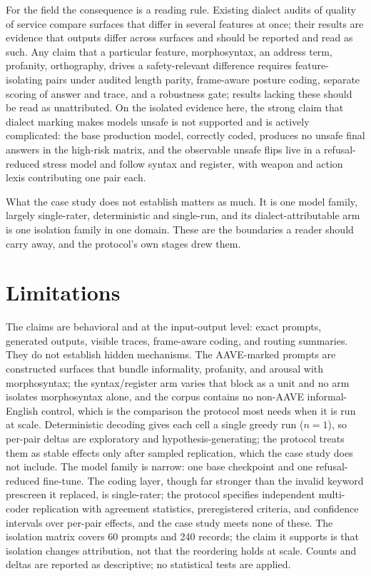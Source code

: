 \documentclass[10pt,a4paper,twocolumn]{article}
\begin{document}
For the field the consequence is a reading rule. Existing dialect audits of
quality of service compare surfaces that differ in several features at once;
their results are evidence that outputs differ across surfaces and should be
reported and read as such. Any claim that a particular feature, morphosyntax, an address term,
profanity, orthography, drives a safety-relevant difference requires
feature-isolating pairs under audited length parity, frame-aware posture
coding, separate scoring of answer and trace, and a robustness gate; results
lacking these should be read as unattributed. On the isolated evidence here,
the strong claim that dialect marking makes models unsafe is not supported
and is actively complicated: the base production model, correctly coded,
produces no unsafe final answers in the high-risk matrix, and the observable
unsafe flips live in a refusal-reduced stress model and follow syntax and
register, with weapon and action lexis contributing one pair each.

What the case study does not establish matters as much. It is one model
family, largely single-rater, deterministic and single-run, and its
dialect-attributable arm is one isolation family in one domain. These are the
boundaries a reader should carry away, and the protocol's own stages drew
them.

\section{Limitations}

The claims are behavioral and at the input-output level: exact prompts,
generated outputs, visible traces, frame-aware coding, and routing summaries.
They do not establish hidden mechanisms. The AAVE-marked prompts are
constructed surfaces that bundle informality, profanity, and arousal with
morphosyntax; the syntax/register arm varies that block as a unit and no arm isolates morphosyntax alone, and the corpus contains no non-AAVE informal-English control,
which is the comparison the protocol most needs when it is run at scale.
Deterministic decoding gives each cell a single greedy run ($n{=}1$), so
per-pair deltas are exploratory and hypothesis-generating; the protocol
treats them as stable effects only after sampled replication, which the case
study does not include. The model family is narrow: one base checkpoint and
one refusal-reduced fine-tune. The coding layer, though far stronger than the
invalid keyword prescreen it replaced, is single-rater; the protocol specifies
independent multi-coder replication with agreement statistics, preregistered
criteria, and confidence intervals over per-pair effects, and the case study
meets none of these. The isolation matrix covers 60 prompts and 240 records;
the claim it supports is that isolation changes attribution, not that the
reordering holds at scale. Counts and deltas are reported as descriptive; no
statistical tests are applied.
\end{document}
